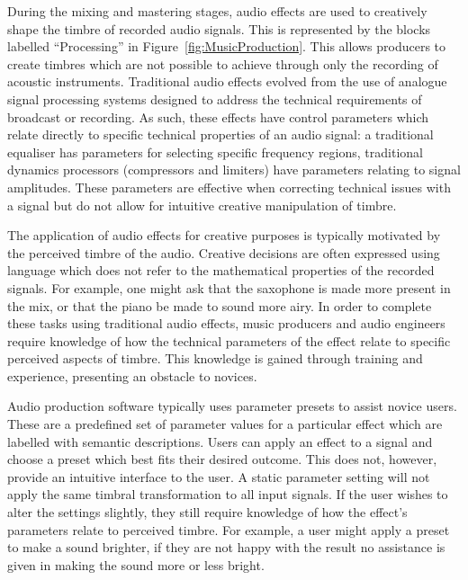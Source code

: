 	During the mixing and mastering stages, audio effects are used to creatively shape the timbre of recorded audio
	signals. This is represented by the blocks labelled ``Processing'' in Figure~\ref{fig:MusicProduction}. This allows
	producers to create timbres which are not possible to achieve through only the recording of acoustic instruments.
	Traditional audio effects evolved from the use of analogue signal processing systems designed to address the
	technical requirements of broadcast or recording. As such, these effects have control parameters which relate
	directly to specific technical properties of an audio signal: a traditional equaliser has parameters for selecting
	specific frequency regions, traditional dynamics processors (compressors and limiters) have parameters relating to
	signal amplitudes. These parameters are effective when correcting technical issues with a signal but do not allow
	for intuitive creative manipulation of timbre.

	The application of audio effects for creative purposes is typically motivated by the perceived timbre of the audio.
	Creative decisions are often expressed using language which does not refer to the mathematical properties of the
	recorded signals. For example, one might ask that the saxophone is made more present in the mix, or that the piano
	be made to sound more airy. In order to complete these tasks using traditional audio effects, music producers and
	audio engineers require knowledge of how the technical parameters of the effect relate to specific perceived aspects
	of timbre. This knowledge is gained through training and experience, presenting an obstacle to novices.

	Audio production software typically uses parameter presets to assist novice users. These are a predefined set of
	parameter values for a particular effect which are labelled with semantic descriptions. Users can apply an effect to
	a signal and choose a preset which best fits their desired outcome. This does not, however, provide an intuitive
	interface to the user. A static parameter setting will not apply the same timbral transformation to all input
	signals. If the user wishes to alter the settings slightly, they still require knowledge of how the effect's
	parameters relate to perceived timbre. For example, a user might apply a preset to make a sound brighter, if they
	are not happy with the result no assistance is given in making the sound more or less bright.

